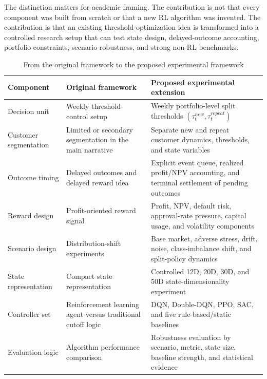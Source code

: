 \documentclass[12pt,a4paper]{article}
\begin{document}
The distinction matters for academic framing. The contribution is not that every component was built from scratch or that a new RL algorithm was invented. The contribution is that an existing threshold-optimization idea is transformed into a controlled research setup that can test state design, delayed-outcome accounting, portfolio constraints, scenario robustness, and strong non-RL benchmarks.

\begin{table}[H]
    \centering
    \small
    \begin{tabular}{p{}p{}p{}}
        \toprule
        Component             & Original framework                                           & Proposed experimental extension                                                                    \\
        \midrule
        Decision unit         & Weekly threshold-control setup                               & Weekly portfolio-level split thresholds $(\tau^{new}_t,\tau^{repeat}_t)$                           \\
        Customer segmentation & Limited or secondary segmentation in the main narrative      & Separate new and repeat customer dynamics, thresholds, and state variables                         \\
        Outcome timing        & Delayed outcomes and delayed reward idea                     & Explicit event queue, realized profit/NPV accounting, and terminal settlement of pending outcomes  \\
        Reward design         & Profit-oriented reward signal                                & Profit, NPV, default risk, approval-rate pressure, capital usage, and volatility components        \\
        Scenario design       & Distribution-shift experiments                               & Base market, adverse stress, drift, noise, class-imbalance shift, and split-policy dynamics        \\
        State representation  & Compact state representation                                 & Controlled 12D, 20D, 30D, and 50D state-dimensionality experiment                                  \\
        Controller set        & Reinforcement learning agent versus traditional cutoff logic & DQN, Double-DQN, PPO, SAC, and five rule-based/static baselines                                    \\
        Evaluation logic      & Algorithm performance comparison                             & Robustness evaluation by scenario, metric, state size, baseline strength, and statistical evidence \\
        \bottomrule
    \end{tabular}
    \caption{From the original framework to the proposed experimental framework}
    \label{tab:framework_extension}
\end{table}
\end{document}
